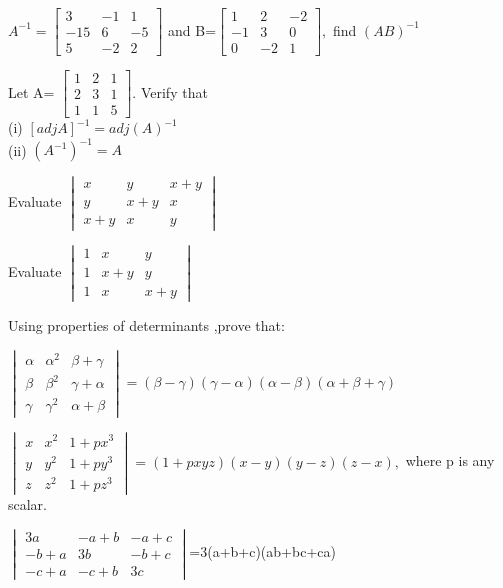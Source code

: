 $A^{-1}=\begin{bmatrix}
3&-1&1 \\ -15&6&-5 \\5&-2&2
\end{bmatrix}$ and B=$\begin{bmatrix}
1&2&-2 \\ -1&3&0 \\0&-2&1
\end{bmatrix},$ find $(AB)^{-1}$\\
\item Let A=
$\begin{bmatrix}
1&2&1 \\ 2&3&1 \\1&1&5
\end{bmatrix}.$ Verify that \\
(i) $[adj A]^{-1}=adj(A)^{-1}$\\
(ii) $(A^{-1})^{-1}=A$\\
\item Evaluate 
$\begin{vmatrix}
x&y&x+y \\ y&x+y&x \\ x+y&x&y
\end{vmatrix}$\\
\solution 

\item Evaluate 
$\begin{vmatrix}
1&x&y \\ 1&x+y&y \\ 1&x&x+y
\end{vmatrix}$
\solution 

Using properties of determinants ,prove that:\\
\item $\begin{vmatrix}
\alpha&\alpha^2&\beta+\gamma \\ \beta&\beta^2&\gamma+\alpha \\ \gamma&\gamma^2&\alpha+\beta
\end{vmatrix}=(\beta-\gamma)(\gamma-\alpha)(\alpha-\beta)(\alpha+\beta+\gamma)$\\
\solution 

\item $\begin{vmatrix}
x&x^2&1+px^3 \\ y&y^2&1+py^3 \\z&z^2&1+pz^3
\end{vmatrix}=(1+pxyz)(x-y)(y-z)(z-x),$ where p is any scalar.\\
\solution 

\item $\begin{vmatrix}
3a&-a+b&-a+c \\ -b+a&3b&-b+c \\ -c+a&-c+b&3c
\end{vmatrix}$=3(a+b+c)(ab+bc+ca)\\
\solution 


    
